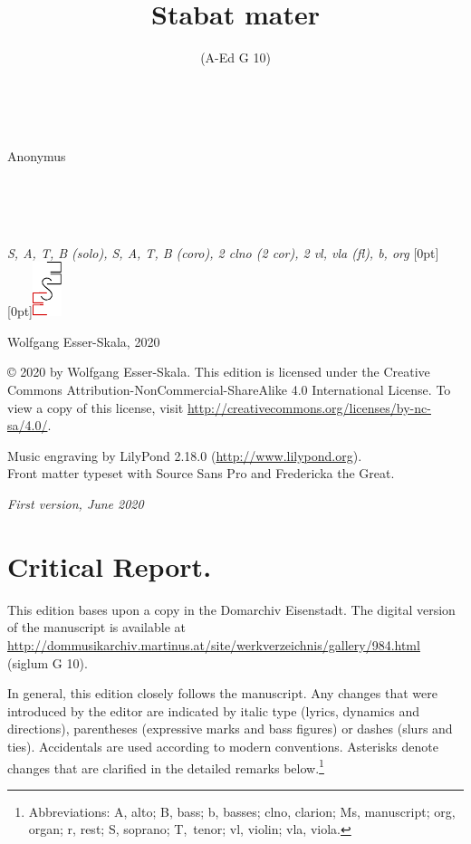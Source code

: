 \documentclass[parskip=full]{scrreprt}
\makeatletter
\DeclareRobustCommand{\sbseries}{\fontseries{sb}\selectfont}
\newcommand\fancytitlehead{
	\headingfont%
	\fontsize{80}{80}\selectfont\textcolor{black!80}{\@ifundefined{@shortname}{\@lastname}{\@shortname}.}\\[15pt]%
	\fontsize{60}{60}\selectfont\@ifundefined{@shorttitle}{\@title}{\@shorttitle}.%
}
\def\lastname#1{\def\@lastname{#1}}
\def\instrumentation#1{\def\@instrumentation{#1}}
\def\maketitle{%
\begin{titlepage}%
	\Large%
	{\@titlehead}%
	\vfill%
	{\strut\@firstname}\\%
	{\sbseries\color{oldred}\strut\@lastname}\\%
	{\strut\@namesuffix}%
	\vfill%
	{\sbseries\@title}\\%
	{\@subtitle}\\[\baselineskip]%
	{\itshape\@instrumentation}%
	\vfill%
	{\itshape\@parts}\hspace*{\fill}\raisebox{0pt}[0pt][0pt]{\includegraphics{ees_logo}}%
\end{titlepage}%
}
\newif\ifprintreport\printreportfalse
\makeatother
\begin{document}
\frenchspacing

\titlehead{\fancytitlehead}
\lastname{Anonymus}
\title{Stabat mater}
\subtitle{(A-Ed G 10)}
\instrumentation{S, A, T, B (solo), S, A, T, B (coro), 2 clno (2 cor), 2 vl, vla (fl), b, org}
\maketitle


\thispagestyle{empty}

\vspace*{\fill}

\hspace*{1em}Wolfgang Esser-Skala, 2020

© 2020 by Wolfgang Esser-Skala. This edition is licensed under the Creative Commons Attribution-NonCommercial-ShareAlike 4.0 International License. To view a copy of this license, visit \url{http://creativecommons.org/licenses/by-nc-sa/4.0/}. 

Music engraving by LilyPond 2.18.0 (\url{http://www.lilypond.org}).\\
Front matter typeset with Source Sans Pro and Fredericka the Great.

\textit{First version, June 2020}

\vspace*{2cm}

\ifprintreport
\chapter*{Critical Report.}

This edition bases upon a copy in the Domarchiv Eisenstadt. The digital version of the manuscript is available at \url{http://dommusikarchiv.martinus.at/site/werkverzeichnis/gallery/984.html} (siglum G 10).

In general, this edition closely follows the manuscript. Any changes that were introduced by the editor are indicated by italic type (lyrics, dynamics and directions), parentheses (expressive marks and bass figures) or dashes (slurs and ties). Accidentals are used according to modern conventions. Asterisks denote changes that are clarified in the detailed remarks below.\footnote{Abbreviations: A, alto; B, bass; b, basses; clno, clarion; Ms, manuscript; org, organ; r, rest; S, soprano; T,~tenor; vl, violin; vla, viola.}
\end{document}
